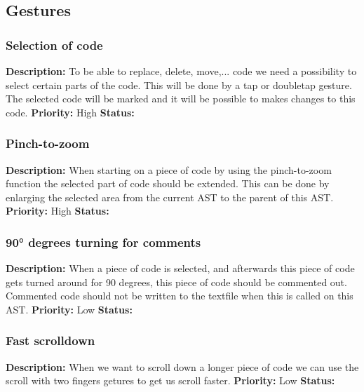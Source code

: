 \documentclass{article}
\begin{document}
\subsection{Gestures}
\subsubsection{Selection of code}
\textbf{Description: } To be able to replace, delete, move,... code we need a possibility to select certain parts of the code. This will be done
by a tap or doubletap gesture. The selected code will be marked and it will be possible to makes changes to this code.\newline
\textbf{Priority:} High \newline
\textbf{Status: } \newline
\subsubsection{Pinch-to-zoom}
\textbf{Description: }When starting on a piece of code by using the pinch-to-zoom function the selected part of code should be extended. This can be done by enlarging the selected
area from the current AST to the parent of this AST. \newline
\textbf{Priority:} High \newline
\textbf{Status: } \newline
\subsubsection{90° degrees turning for comments}
\textbf{Description: }When a piece of code is selected, and afterwards this piece of code gets turned around for 90 degrees, this piece of code should be commented out. 
Commented code should not be written to the textfile when this is called on this AST. \newline
\textbf{Priority:} Low \newline
\textbf{Status: } \newline
\subsubsection{Fast scrolldown}
\textbf{Description: }When we want to scroll down a longer piece of code we can use the scroll with two fingers getures to get us scroll faster. \newline
\textbf{Priority:} Low \newline
\textbf{Status: } \newline
\end{document}
